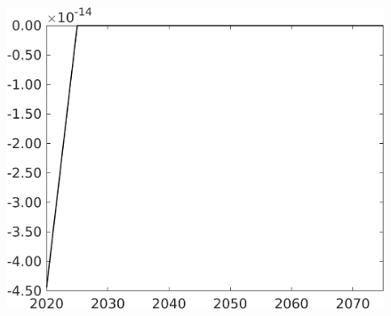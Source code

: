 \documentclass[12pt]{article}
\begin{document}
\begin{figure}[h!!]
\begin{minipage}[]{0.32\textwidth}
	\end{minipage}	
	\begin{minipage}[]{0.32\textwidth}
		\includegraphics[width=1\textwidth]{../../codding_model/own_basedOnFried/optimalPol_010922_revision/figures/all_13Sept22/CompTaufPER_bytaul_Equlab_Reg0_F_spillover0_nsk0_xgr0_knspil1_sep1_LFlimit1_emsbase0_countec0_GovRev0_etaa0.79_lgd0.png}
	\end{minipage}	
\end{figure}
\end{document}
